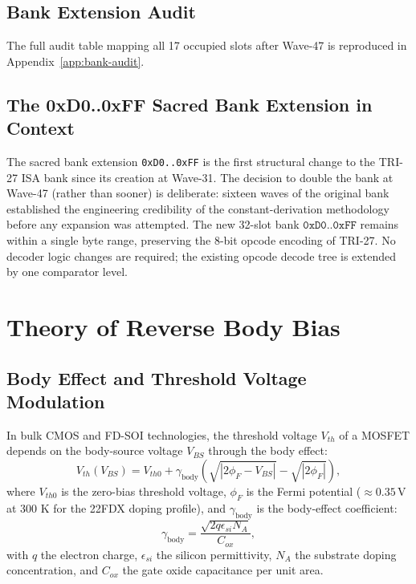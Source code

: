 \subsection{Bank Extension Audit}

The full audit table mapping all 17 occupied slots after Wave-47 is
reproduced in Appendix~\ref{app:bank-audit}.

\subsection{The 0xD0..0xFF Sacred Bank Extension in Context}

The sacred bank extension \texttt{0xD0..0xFF} is the first structural
change to the TRI-27 ISA bank since its creation at Wave-31.
The decision to double the bank at Wave-47 (rather than sooner) is
deliberate: sixteen waves of the original bank established the engineering
credibility of the constant-derivation methodology before any expansion was
attempted.
The new 32-slot bank
$\texttt{0xD0..0xFF}$
remains within a single byte range, preserving the 8-bit opcode encoding
of TRI-27.
No decoder logic changes are required; the existing opcode decode tree
is extended by one comparator level.

\section{Theory of Reverse Body Bias}
\label{sec:rbb-theory-w47}

\subsection{Body Effect and Threshold Voltage Modulation}

In bulk CMOS and FD-SOI technologies, the threshold voltage $V_{th}$ of a
MOSFET depends on the body-source voltage $V_{BS}$ through the body effect:
\begin{equation}\label{eq:vth-body}
  V_{th}(V_{BS}) = V_{th0} + \gamma_{\mathrm{body}}
    \left(\sqrt{|2\phi_F - V_{BS}|} - \sqrt{|2\phi_F|}\right),
\end{equation}
where $V_{th0}$ is the zero-bias threshold voltage, $\phi_F$ is the Fermi
potential ($\approx 0.35\,\text{V}$ at 300 K for the 22FDX doping profile),
and $\gamma_{\mathrm{body}}$ is the body-effect coefficient:
\begin{equation}\label{eq:gamma-body}
  \gamma_{\mathrm{body}} = \frac{\sqrt{2 q \epsilon_{si} N_A}}{C_{ox}},
\end{equation}
with $q$ the electron charge, $\epsilon_{si}$ the silicon permittivity,
$N_A$ the substrate doping concentration, and $C_{ox}$ the gate oxide
capacitance per unit area.

